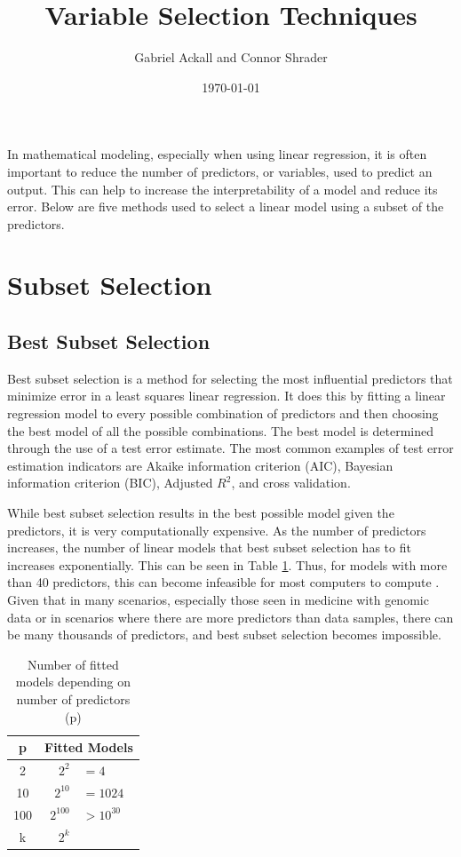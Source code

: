 \documentclass{article}
\title{Variable Selection Techniques}
\author{Gabriel Ackall and Connor Shrader}
\date{\today}
\begin{document}
\maketitle

In mathematical modeling, especially when using linear regression, it is often important to reduce the number of predictors, or variables, used to predict an output. This can help to increase the interpretability of a model and reduce its error. Below are five methods used to select a linear model using a subset of the predictors.


\section{Subset Selection}
\subsection{Best Subset Selection}
Best subset selection is a method for selecting the most influential predictors that minimize error in a least squares linear regression. It does this by fitting a linear regression model to every possible combination of predictors and then choosing the best model of all the possible combinations. The best model is determined through the use of a test error estimate. The most common examples of test error estimation indicators are Akaike information criterion (AIC), Bayesian information criterion (BIC), Adjusted $R^2$, and cross validation.

While best subset selection results in the best possible model given the predictors, it is very computationally expensive. As the number of predictors increases, the number of linear models that best subset selection has to fit increases exponentially. This can be seen in Table \ref{tab:subset-combinations}. Thus, for models with more than 40 predictors, this can become infeasible for most computers to compute \cite{james2013introduction}. Given that in many scenarios, especially those seen in medicine with genomic data or in scenarios where there are more predictors than data samples, there can be many thousands of predictors, and best subset selection becomes impossible.

\begin{table}[h!]
	\centering
	\caption{Number of fitted models depending on number of predictors (p)}
	\vspace{0.1in}
	\begin{tabular}{c|r@{\hskip 4pt}l}
		\hline
		p  &  \multicolumn{2}{c}{Fitted Models}\\
		\hline
		2   & $2^2$ & $=4$ \\
		10  & $2^{10}$ & $=1024$ \\
		100 & $2^{100}$ & $>10^{30}$ \\
		k   & $2^k$ & \\
	\end{tabular}
\label{tab:subset-combinations}
\end{table}
\end{document}
